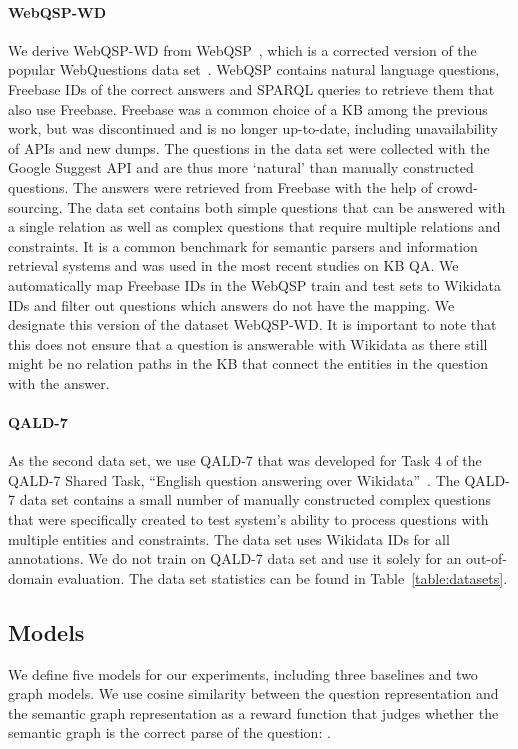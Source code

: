 \documentclass[11pt]{article}
\begin{document}
\paragraph{WebQSP-WD} We derive WebQSP-WD from WebQSP~\cite{Yih2016}, which is a corrected version of the popular WebQuestions data set~\cite{Berant2013}. WebQSP contains natural language questions, Freebase IDs of the correct answers and SPARQL queries to retrieve them that also use Freebase. Freebase was a common choice of a KB among the previous work, but was discontinued and is no longer up-to-date, including unavailability of APIs and new dumps. 
The questions in the data set were collected with the Google Suggest API and are thus more `natural' than manually constructed questions. The answers were retrieved from Freebase with the help of crowd-sourcing. The data set contains both simple questions that can be answered with a single relation as well as complex questions that require multiple relations and constraints. It is a common benchmark for semantic parsers and information retrieval systems and was used in the most recent studies on KB QA.
We automatically map Freebase IDs in the WebQSP train and test sets to Wikidata IDs and filter out questions which answers do not have the mapping.  We designate this version of the dataset WebQSP-WD. It is important to note that this does not ensure that a question is answerable with Wikidata as there still might be no relation paths in the KB that connect the entities in the question with the answer.

\paragraph{QALD-7}  As the second data set, we use QALD-7 that was developed for Task 4 of the QALD-7 Shared Task, ``English question answering over Wikidata''~\cite{10.1007/978-3-319-69146-6_6}. The QALD-7 data set contains a small number of manually constructed complex questions that were specifically created to test system's ability to process questions with multiple entities and constraints. The data set uses Wikidata IDs for all annotations. We do not train on QALD-7 data set and use it solely for an out-of-domain evaluation. The data set statistics can be found in Table~\ref{table:datasets}.

\subsection{Models}

We define five models for our experiments, including three baselines and two graph models. We use cosine similarity between the question representation and the semantic graph representation as a reward function that judges whether the semantic graph is the correct parse of the question: .
\end{document}
